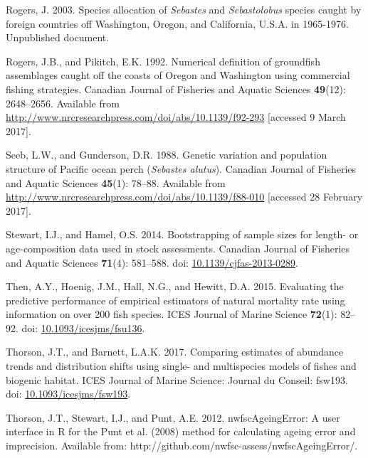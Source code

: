 \documentclass[12pt,]{article}
\begin{document}
\hypertarget{ref-rogers_species_2003}{}
Rogers, J. 2003. Species allocation of \emph{Sebastes} and
\emph{Sebastolobus} species caught by foreign countries off Washington,
Oregon, and California, U.S.A. in 1965-1976. Unpublished document.

\hypertarget{ref-rogers_numerical_1992}{}
Rogers, J.B., and Pikitch, E.K. 1992. Numerical definition of groundfish
assemblages caught off the coasts of Oregon and Washington using
commercial fishing strategies. Canadian Journal of Fisheries and Aquatic
Sciences \textbf{49}(12): 2648--2656. Available from
\url{http://www.nrcresearchpress.com/doi/abs/10.1139/f92-293}
{[}accessed 9 March 2017{]}.

\hypertarget{ref-seeb_genetic_1988}{}
Seeb, L.W., and Gunderson, D.R. 1988. Genetic variation and population
structure of Pacific ocean perch (\emph{Sebastes alutus}). Canadian
Journal of Fisheries and Aquatic Sciences \textbf{45}(1): 78--88.
Available from
\url{http://www.nrcresearchpress.com/doi/abs/10.1139/f88-010}
{[}accessed 28 February 2017{]}.

\hypertarget{ref-stewart_bootstrapping_2014}{}
Stewart, I.J., and Hamel, O.S. 2014. Bootstrapping of sample sizes for
length- or age-composition data used in stock assessments. Canadian
Journal of Fisheries and Aquatic Sciences \textbf{71}(4): 581--588. doi:
\href{https://doi.org/10.1139/cjfas-2013-0289}{10.1139/cjfas-2013-0289}.

\hypertarget{ref-then_evaluating_2015}{}
Then, A.Y., Hoenig, J.M., Hall, N.G., and Hewitt, D.A. 2015. Evaluating
the predictive performance of empirical estimators of natural mortality
rate using information on over 200 fish species. ICES Journal of Marine
Science \textbf{72}(1): 82--92. doi:
\href{https://doi.org/10.1093/icesjms/fsu136}{10.1093/icesjms/fsu136}.

\hypertarget{ref-thorson_comparing_2017}{}
Thorson, J.T., and Barnett, L.A.K. 2017. Comparing estimates of
abundance trends and distribution shifts using single- and multispecies
models of fishes and biogenic habitat. ICES Journal of Marine Science:
Journal du Conseil: fsw193. doi:
\href{https://doi.org/10.1093/icesjms/fsw193}{10.1093/icesjms/fsw193}.

\hypertarget{ref-thorson_nwfscageingerror:_2012}{}
Thorson, J.T., Stewart, I.J., and Punt, A.E. 2012. nwfscAgeingError: A
user interface in R for the Punt et al. (2008) method for calculating
ageing error and imprecision. Available from:
http://github.com/nwfsc-assess/nwfscAgeingError/.
\end{document}
